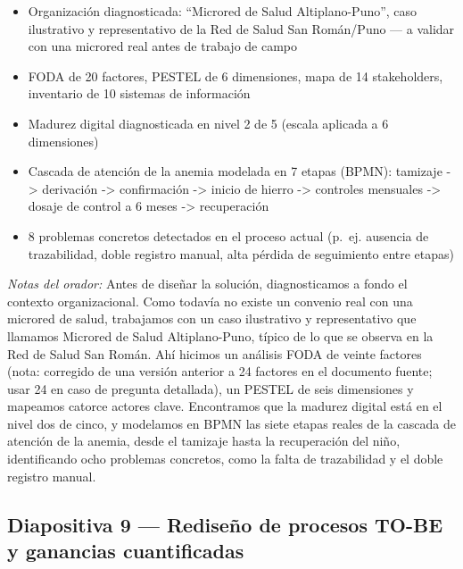 \documentclass[11pt,a4paper]{article}
\providecommand{\tightlist}{%
  \setlength{\itemsep}{0pt}\setlength{\parskip}{0pt}}
\begin{document}
\begin{itemize}
\tightlist
\item
  Organización diagnosticada: ``Microred de Salud Altiplano-Puno'', caso ilustrativo y representativo de la Red de Salud San Román/Puno --- a validar con una microred real antes de trabajo de campo
\item
  FODA de 20 factores, PESTEL de 6 dimensiones, mapa de 14 stakeholders, inventario de 10 sistemas de información
\item
  Madurez digital diagnosticada en nivel 2 de 5 (escala aplicada a 6 dimensiones)
\item
  Cascada de atención de la anemia modelada en 7 etapas (BPMN): tamizaje -\textgreater{} derivación -\textgreater{} confirmación -\textgreater{} inicio de hierro -\textgreater{} controles mensuales -\textgreater{} dosaje de control a 6 meses -\textgreater{} recuperación
\item
  8 problemas concretos detectados en el proceso actual (p.~ej. ausencia de trazabilidad, doble registro manual, alta pérdida de seguimiento entre etapas)
\end{itemize}

\emph{Notas del orador:} Antes de diseñar la solución, diagnosticamos a fondo el contexto organizacional. Como todavía no existe un convenio real con una microred de salud, trabajamos con un caso ilustrativo y representativo que llamamos Microred de Salud Altiplano-Puno, típico de lo que se observa en la Red de Salud San Román. Ahí hicimos un análisis FODA de veinte factores (nota: corregido de una versión anterior a 24 factores en el documento fuente; usar 24 en caso de pregunta detallada), un PESTEL de seis dimensiones y mapeamos catorce actores clave. Encontramos que la madurez digital está en el nivel dos de cinco, y modelamos en BPMN las siete etapas reales de la cascada de atención de la anemia, desde el tamizaje hasta la recuperación del niño, identificando ocho problemas concretos, como la falta de trazabilidad y el doble registro manual.

\subsection{Diapositiva 9 --- Rediseño de procesos TO-BE y ganancias cuantificadas}\label{diapositiva-9-rediseuxf1o-de-procesos-to-be-y-ganancias-cuantificadas}
\end{document}
